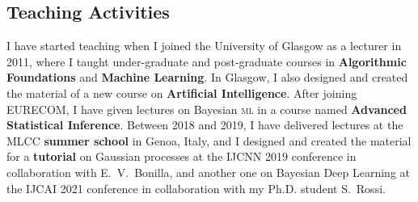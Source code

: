 \documentclass[a4paper,10pt]{article}
\newcommand{\ml}{\name{ml}}
\newcommand{\name}[1]{{\textsc{#1}}\xspace}
\begin{document}



\subsection*{Teaching Activities}

I have started teaching when I joined the University of Glasgow as a lecturer in 2011, where I taught under-graduate and post-graduate courses in {\bf Algorithmic Foundations} and {\bf Machine Learning}.
In Glasgow, I also designed and created the material of a new course on {\bf Artificial Intelligence}. 
After joining EURECOM, I have given lectures on Bayesian \ml in a course named {\bf Advanced Statistical Inference}.
Between 2018 and 2019, I have delivered lectures at the MLCC {\bf summer school} in Genoa, Italy, and I designed and created the material for a {\bf tutorial} on Gaussian processes at the IJCNN 2019 conference in collaboration with E.~V.~Bonilla, and another one on Bayesian Deep Learning at the IJCAI 2021 conference in collaboration with my Ph.D. student S.~Rossi. 

\end{document}
